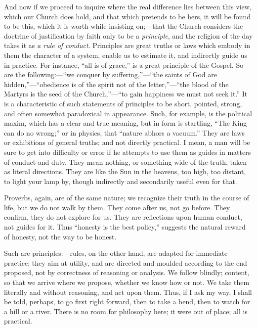 And now if we proceed to inquire where the real difference lies
between this view, which our Church does hold, and that which pretends
to be hers, it will be found to be this, which it is worth while
insisting on;—that the Church considers the doctrine of
justification by faith only to be a \emph{principle}, and the religion
of the day takes it as \emph{a rule of conduct}. Principles are great
truths or laws which embody in them the character of a system, enable
us to estimate it, and indirectly guide us in practice. For instance,
``all is of grace,'' is a great principle of the Gospel. So
are the following:—``we conquer by suffering,''—``the
saints of God are hidden,''—``obedience is of the spirit not
of the letter,''—``the blood of the Martyrs is the seed of
the Church,''—``to gain happiness we must not seek it.''
It is a characteristic of such statements of principles to be short,
pointed, strong, and often somewhat paradoxical in appearance. Such,
for example, is the political maxim, which has a clear and true
meaning, but in form is startling, ``The King can do no
wrong;'' or in physics, that ``nature abhors a vacuum.'' They are laws or exhibitions of general truths; and not
directly practical. I mean, a man will be sure to get into difficulty
or error if he attempts to use them as guides in matters of conduct
and duty. They mean nothing, or something wide of the truth, taken as
literal directions. They are like the Sun in the heavens, too high,
too distant, to light your lamp by, though indirectly and secondarily
useful even for that.

Proverbs, again, are of the same nature; we recognize their truth
in the course of life, but we do not walk by them. They come after us,
not go before. They confirm, they do not explore for us. They are
reflections upon human conduct, not guides for it. Thus ``honesty
is the best policy,'' suggests the natural reward of honesty, not
the way to be honest.

Such are principles:—rules, on the other hand, are adapted for
immediate practice; they aim at utility, and are directed and moulded
according to the end proposed, not by correctness of reasoning or
analysis. We follow blindly; content, so that we arrive where we
propose, whether we know how or not. We take them literally and
without reasoning, and act upon them. Thus, if I ask my way, I shall
be told, perhaps, to go first right forward, then to take a bend, then
to watch for a hill or a river. There is no room for philosophy here;
it were out of place; all is practical.


